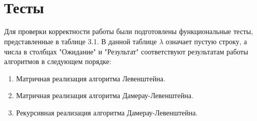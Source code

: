 \documentclass[12pt, a4paper]{report}
\begin{document}
	\begin{lstlisting}[label=some-code,caption=Алгоритм Винограда]
	
	\end{lstlisting}

	\begin{lstlisting}[label=some-code,caption=Рекурсивная реализация алгоритма Дамерау-Левенштейна]
	
	\end{lstlisting}

	\newpage

	\section{Тесты}
	Для проверки корректности работы были подготовлены функциональные тесты, представленные в таблице 3.1. В данной таблице $\lambda$ означает пустую строку, а числа в столбцах "Ожидание" и "Результат" соответствуют результатам работы алгоритмов в следующем порядке:
	\begin{enumerate}
		\item Матричная реализация алгоритма Левенштейна.
		\item Матричная реализация алгоритма Дамерау-Левенштейна.
		\item Рекурсивная реализация алгоритма Дамерау-Левенштейна.
	\end{enumerate}
\end{document}
